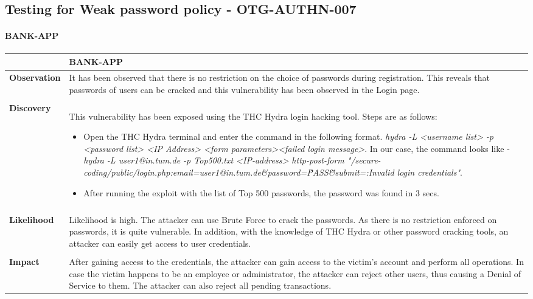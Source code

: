 \subsection{Testing for Weak password policy - OTG-AUTHN-007} \label{OTG-AUTHN-007}


\paragraph{BANK-APP} \mbox{}
\begin{longtable*}{p{.20\textwidth} | p{.80\textwidth}}
    \hline
    & \textbf{BANK-APP} \\
    \hline
    \textbf{Observation} &
    It has been observed that there is no restriction on the choice of passwords during registration. This reveals that passwords of users can be cracked and this vulnerability has been observed in the Login page.
    \\\\
    \textbf{Discovery} &
      This vulnerability has been exposed using the THC Hydra login hacking tool. Steps are as follows:
      \begin{itemize}
	      \item Open the THC Hydra terminal and enter the command in the following format.
	            \textit{hydra -L <username list> -p <password list> <IP Address> <form parameters><failed login message>}. In our case, the command looks like - 
	                  \textit{hydra -L user1@in.tum.de -p Top500.txt <IP-address> http-post-form  "/secure-coding/public/login.php:email=user1@in.tum.de\&password=\^PASS\^  \&submit=:Invalid login credentials"}.
	             \item After running the exploit with the list of Top 500 passwords, the password was found in 3 secs.
      \end{itemize}
    \\\\
    \textbf{Likelihood} &
        Likelihood is high.
        The attacker can use Brute Force to crack the passwords. As there is no restriction enforced on passwords, it is quite vulnerable. In addition, with the knowledge of THC Hydra or other password cracking tools, an attacker can easily get access to user credentials.
    \\\\
    \textbf{Impact} &
        After gaining access to the credentials, the attacker can gain access to the victim's account and perform all operations. In case the victim happens to be an employee or administrator, the attacker can reject other users, thus causing a Denial of Service to them. The attacker can also reject all pending transactions. 

\end{longtable*}

